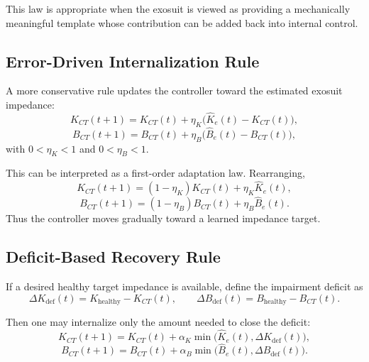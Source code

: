 \documentclass[11pt]{article}
\begin{document}
This law is appropriate when the exosuit is viewed as providing a mechanically meaningful template whose contribution can be added back into internal control.

\subsection{Error-Driven Internalization Rule}

A more conservative rule updates the controller toward the estimated exosuit impedance:
\begin{equation}
K_{CT}(t+1) = K_{CT}(t) + \eta_K\bigl(\hat{K}_e(t)-K_{CT}(t)\bigr),
\label{eq:conv_K}
\end{equation}
\begin{equation}
B_{CT}(t+1) = B_{CT}(t) + \eta_B\bigl(\hat{B}_e(t)-B_{CT}(t)\bigr),
\label{eq:conv_B}
\end{equation}
with \(0<\eta_K<1\) and \(0<\eta_B<1\).

This can be interpreted as a first-order adaptation law. Rearranging,
\begin{equation}
K_{CT}(t+1) = (1-\eta_K)K_{CT}(t) + \eta_K \hat{K}_e(t),
\end{equation}
\begin{equation}
B_{CT}(t+1) = (1-\eta_B)B_{CT}(t) + \eta_B \hat{B}_e(t).
\end{equation}
Thus the controller moves gradually toward a learned impedance target.

\subsection{Deficit-Based Recovery Rule}

If a desired healthy target impedance is available, define the impairment deficit as
\begin{equation}
\Delta K_{\mathrm{def}}(t) = K_{\mathrm{healthy}} - K_{CT}(t),
\qquad
\Delta B_{\mathrm{def}}(t) = B_{\mathrm{healthy}} - B_{CT}(t).
\end{equation}

Then one may internalize only the amount needed to close the deficit:
\begin{equation}
K_{CT}(t+1) = K_{CT}(t) + \alpha_K \min\bigl(\hat{K}_e(t), \Delta K_{\mathrm{def}}(t)\bigr),
\end{equation}
\begin{equation}
B_{CT}(t+1) = B_{CT}(t) + \alpha_B \min\bigl(\hat{B}_e(t), \Delta B_{\mathrm{def}}(t)\bigr).
\end{equation}
\end{document}
